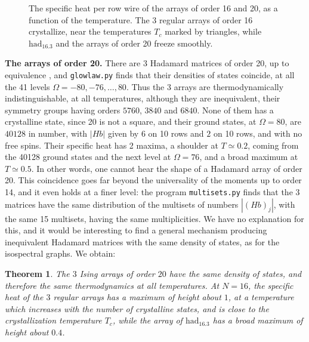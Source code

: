 \documentclass[11pt,a4paper]{article}
\newtheorem{thm}{Theorem}[section]
\theoremstyle{remark}
\begin{document}
\begin{figure}[htb!]
\caption{The specific heat per row wire of the arrays of order 16 and 20, as a function of the temperature. The 3 regular arrays of order 16 crystallize, near the temperatures $T_c$ marked by triangles, while $\mathrm{had}_{16.3}$ and the arrays of order 20 freeze smoothly.}\label{fig:heat}
\end{figure}

\medskip

\noindent\textbf{The arrays of order 20.}
There are 3 Hadamard matrices of order 20, up to equivalence \cite{ha2}, and \texttt{glowlaw.py} finds that their densities of states coincide, at all the 41 levels $\Omega=-80,-76,\ldots,80$. Thus the 3 arrays are thermodynamically indistinguishable, at all temperatures, although they are inequivalent, their symmetry groups having orders $5760$, $3840$ and $6840$. None of them has a crystalline state, since 20 is not a square, and their ground states, at $\Omega=80$, are $40128$ in number, with $|Hb|$ given by $6$ on 10 rows and $2$ on 10 rows, and with no free spins. Their specific heat has 2 maxima, a shoulder at $T\simeq0.2$, coming from the 40128 ground states and the next level at $\Omega=76$, and a broad maximum at $T\simeq0.5$. In other words, one cannot hear the shape of a Hadamard array of order 20. This coincidence goes far beyond the universality of the moments up to order 14, and it even holds at a finer level: the program \texttt{multisets.py} finds that the 3 matrices have the same distribution of the multisets of numbers $|(Hb)_j|$, with the same 15 multisets, having the same multiplicities. We have no explanation for this, and it would be interesting to find a general mechanism producing inequivalent Hadamard matrices with the same density of states, as for the isospectral graphs. We obtain:

\begin{samepage}
\begin{thm}\label{thm:exact}
The $3$ Ising arrays of order $20$ have the same density of states, and therefore the same thermodynamics at all temperatures. At $N=16$, the specific heat of the $3$ regular arrays has a maximum of height about $1$, at a temperature which increases with the number of crystalline states, and is close to the crystallization temperature $T_c$, while the array of $\mathrm{had}_{16.3}$ has a broad maximum of height about $0.4$.
\end{thm}
\end{samepage}
\end{document}
